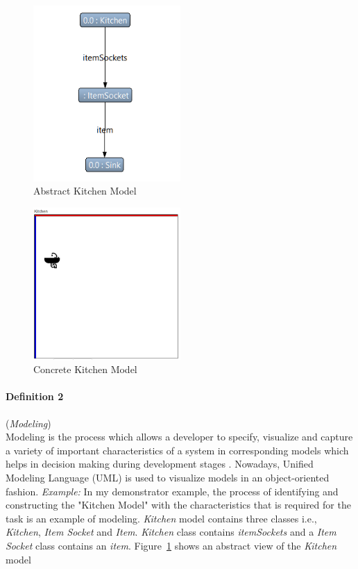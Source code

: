 \begin{figure}
	\includegraphics[width=0.5\textwidth]{figures/KitchenModel_Abstract}
	\caption{Abstract Kitchen Model}
	\label{fig:Abstract_KitchenModel}
\end{figure}

\begin{figure}
	\includegraphics[width=0.5\textwidth]{figures/Kitchen_Concrete}
	\caption{Concrete Kitchen Model}
	\label{fig:Concrete_KitchenModel}
\end{figure}

\paragraph{Definition 2} (\textit{Modeling})\\
Modeling is the process which allows a developer to specify, visualize and capture a variety of important characteristics of a system in corresponding models which helps in decision making during development stages \cite{uml}. Nowadays, Unified Modeling Language (UML) \cite{uml} is used to visualize models in an object-oriented fashion.
\newline\newline\textit{Example:} In my demonstrator example, the process of identifying and constructing the "Kitchen Model" with the characteristics that is required for the task is an example of modeling. \textit{Kitchen} model contains three classes i.e., \textit{Kitchen}, \textit{Item Socket} and \textit{Item}. \textit{Kitchen} class contains \textit{itemSockets} and a \textit{Item Socket} class contains an \textit{item}. Figure~\ref{fig:Abstract_KitchenModel} shows an abstract view of the \textit{Kitchen} model 

